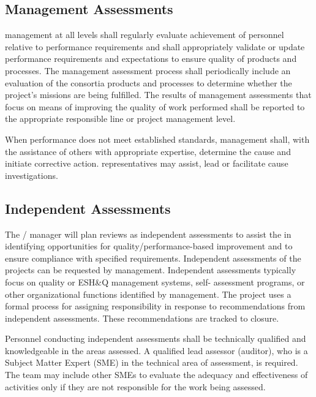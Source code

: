 \subsection{Management Assessments}

 management at all levels shall regularly evaluate
achievement of personnel relative to performance requirements and
shall appropriately validate or update performance requirements and
expectations to ensure quality of products and processes. The
management assessment process shall periodically include an evaluation
of the consortia products and processes to determine whether the
project's missions are being fulfilled. The results of management
assessments that focus on means of improving the quality of work
performed shall be reported to the appropriate responsible line or
project management level.

When performance does not meet established standards, management
shall, with the assistance of others with appropriate expertise,
determine the cause and initiate corrective action. 
representatives may assist, lead or facilitate cause investigations.

\subsection{Independent Assessments}

The /  manager will plan reviews as
independent assessments to assist the   in
identifying opportunities for quality/performance-based improvement
and to ensure compliance with specified requirements. Independent
assessments of the  projects can be requested by
 management. Independent assessments typically focus on
quality or ESH\&Q management systems, self- assessment programs, or
other organizational functions identified by management. The
 project uses a formal process for assigning
responsibility in response to recommendations from independent
assessments. These recommendations are tracked to closure.

Personnel conducting independent assessments shall be technically
qualified and knowledgeable in the areas assessed. A qualified lead
assessor (auditor), who is a Subject Matter Expert (SME) in the
technical area of assessment, is required. The team may include other
SMEs to evaluate the adequacy and effectiveness of activities only if
they are not responsible for the work being assessed.

